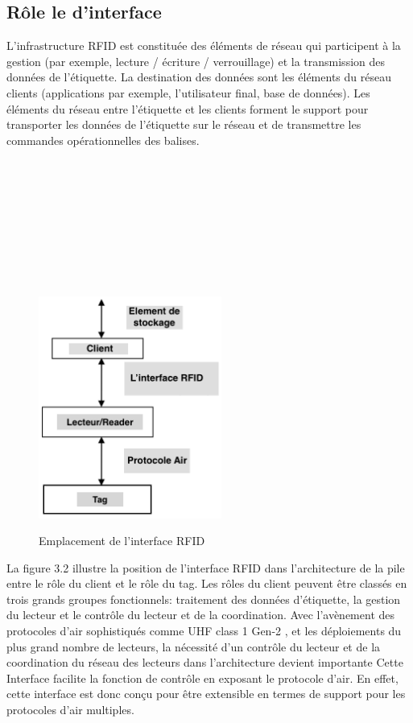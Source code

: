 \documentclass[11pt, a4paper, twoside]{book}
\begin{document}
\subsection{Rôle le d'interface}
L'infrastructure RFID est constituée des éléments de réseau qui participent à la gestion (par exemple, lecture / écriture / verrouillage) et la transmission des données de l'étiquette. La destination des données sont les éléments du réseau clients (applications par exemple, l'utilisateur final, base de données). Les éléments du réseau entre l'étiquette et les clients forment le support pour transporter les données de l'étiquette sur le réseau et de transmettre les commandes opérationnelles des balises.\\\\\\\\\\\\\\\\\\
\begin{figure}[H]
\centering
\includegraphics[width=6cm,height=8cm]{orga}
\caption{Emplacement de l'interface RFID}
\end{figure}

La figure 3.2 illustre la position de l'interface RFID dans l'architecture de la pile entre le  rôle  du client  et le rôle du tag. Les rôles du client peuvent être classés en trois grands groupes fonctionnels: traitement des données d'étiquette, la gestion du lecteur et le contrôle du lecteur et de la coordination. Avec l'avènement des protocoles d'air sophistiqués comme UHF class 1 Gen-2 \cite{air}, et les déploiements du plus grand nombre de lecteurs, la nécessité d'un contrôle du lecteur et de la coordination  du réseau des lecteurs dans l'architecture devient importante
Cette Interface  facilite la fonction de contrôle en exposant le protocole d'air. En effet, cette interface est donc conçu pour être extensible en termes de support pour les protocoles d'air multiples.\\
\end{document}
